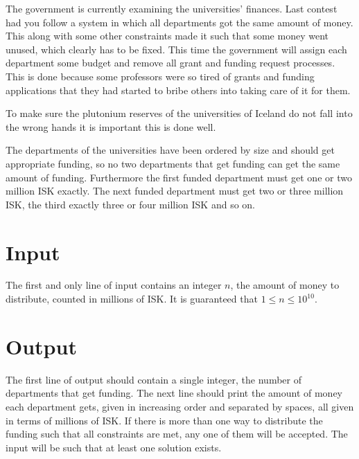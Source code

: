 
The government is currently examining the universities' finances.
Last contest had you follow a system in which all departments got the same
amount of money. This along with some other constraints made it such that
some money went unused, which clearly has to be fixed.
This time the government will assign each department some budget and remove
all grant and funding request processes.
This is done because some professors were so tired of grants and funding
applications that they had started to bribe others into taking care of it
for them.

To make sure the plutonium reserves of the universities of Iceland do not
fall into the wrong hands it is important this is done well.

The departments of the universities have been ordered by size and should get
appropriate funding, so no two departments that get funding can get the same
amount of funding. 
Furthermore the first funded department must get one or two million ISK exactly.
The next funded department must get two or three million ISK, the third exactly
three or four million ISK and so on.

\section*{Input}
The first and only line of input contains an integer $n$, the amount of money
to distribute, counted in millions of ISK. It is guaranteed that $1 \leq n \leq 10^{10}$.

\section*{Output}
The first line of output should contain a single integer, the number of departments
that get funding. The next line should print the amount of money each department gets,
given in increasing order and separated by spaces, all given in terms of millions of ISK.
If there is more than one way to distribute the funding such that all constraints are met,
any one of them will be accepted.
The input will be such that at least one solution exists.
